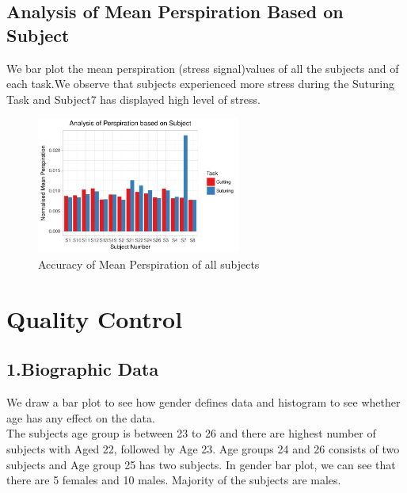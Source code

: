 \documentclass[12pt,epsf]{report}
\begin{document}
{\subsection*{Analysis of Mean Perspiration Based on Subject}
We bar plot the mean perspiration (stress signal)values of all the subjects and of each task.We observe that subjects experienced more stress during the Suturing Task and Subject7 has displayed high level of stress.\\
\begin{figure}[!htb]
	\centering
	\includegraphics[width=0.6\textwidth]{SubjectVsPP.pdf}
	\caption{Accuracy of Mean Perspiration of all subjects}
	\centering
\end{figure}
\newpage
\FloatBarrier
\section*{Quality Control}
\FloatBarrier
\subsection*{1.Biographic Data}
We draw a bar plot to see how gender defines data and histogram to see whether age has any effect on the data.\\
The subjects age group is between 23 to 26 and there are highest number of subjects with Aged 22, followed by Age 23. Age groups 24 and 26 consists of two subjects and Age group 25 has two subjects. In gender bar plot, we can see that there are 5 females and 10 males. Majority of the subjects are males.

}
\end{document}
